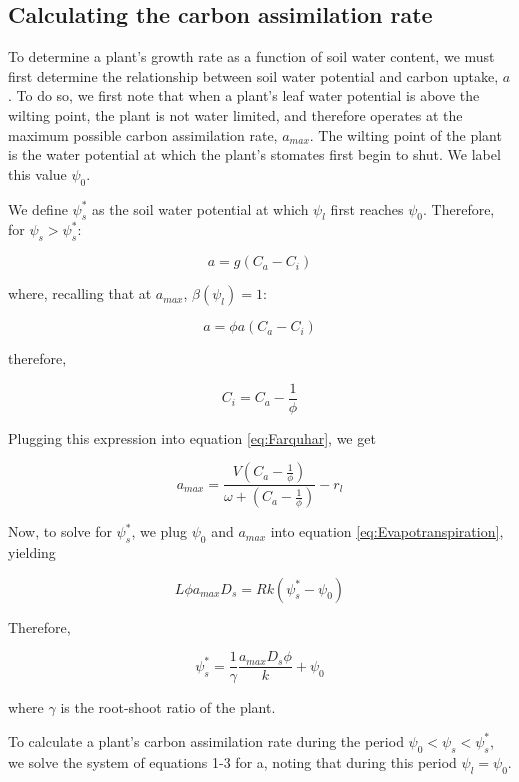 \documentclass{article}
\begin{document}
  \subsection{Calculating the carbon assimilation rate} \label{calculating a}

  To determine a plant's growth rate as a function of soil
  water content, we must first determine the relationship between soil water potential
  and carbon uptake, $a$. To do so, we first note that when a plant's leaf water
  potential is above the wilting point, the plant is not water limited, and
  therefore operates at the maximum possible carbon assimilation rate, $a_{max}$. The wilting point of the plant is the water potential at which
  the plant's stomates first begin to shut. We label this value $\psi_{0}$.

  We define $\psi_{s}^{*}$ as the soil water potential at which $\psi_{l}$ first reaches
  $\psi_{0}$. Therefore, for $\psi_{s} > \psi_{s}^{*}$:

  $$a = g(C_{a} - C_{i})$$

  where, recalling that at $a_{max}$, $ \beta(\psi_{l}) = 1 $:

  $$a = \phi a (C_{a} - C_{i})$$

  therefore,

  $$C_{i} = C_{a} - \frac{1}{\phi}$$

  Plugging this expression into equation \ref{eq:Farquhar}, we get


  \begin{equation} \label{eq:amax}
    a_{max} = \frac{V \left( C_{a} - \frac{1}{\phi} \right) }{ \omega + \left( C_{a} - \frac{1}{\phi} \right) } - r_{l}
  \end{equation}
  

  Now, to solve for $\psi_{s}^{*}$, we plug $\psi_{0}$ and $a_{max}$ into
  equation \ref{eq:Evapotranspiration}, yielding

  $$L \phi a_{max} D_{s} = R k (\psi_{s}^{*} - \psi_{0})$$

  Therefore,

  \begin{equation} \label{eq:psistar}
    \psi_{s}^{*} = \frac{1}{\gamma} \frac{a_{max}D_{s}\phi}{k} + \psi_{0}
  \end{equation}

  where $\gamma$ is the root-shoot ratio of the plant.

  To calculate a plant's carbon assimilation rate during the period
  $\psi_{0} < \psi_{s} < \psi_{s}^{*}$, we solve the system of equations 1-3 for
  a, noting that during this period $\psi_{l} = \psi_{0}$.
\end{document}
